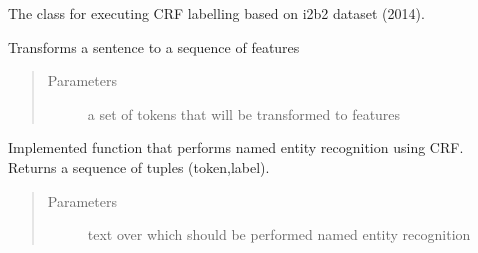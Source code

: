 \documentclass[letterpaper,10pt,english]{sphinxmanual}
\begin{document}
\begin{fulllineitems}
\label{\detokenize{contents:ner_plugins.NER_CRF.NER_CRF}}
The class for executing CRF labelling based on i2b2 dataset (2014).

\begin{fulllineitems}
\label{\detokenize{contents:ner_plugins.NER_CRF.NER_CRF.doc2features}}
Transforms a sentence to a sequence of features
\begin{quote}\begin{description}
\item[{Parameters}] \leavevmode
{} \textendash{} a set of tokens that will be transformed to features

\end{description}\end{quote}

\end{fulllineitems}


\begin{fulllineitems}
\label{\detokenize{contents:ner_plugins.NER_CRF.NER_CRF.perform_NER}}
Implemented function that performs named entity recognition using CRF. Returns a sequence of tuples (token,label).
\begin{quote}\begin{description}
\item[{Parameters}] \leavevmode
{} \textendash{} text over which should be performed named entity recognition

\end{description}\end{quote}

\end{fulllineitems}



\end{fulllineitems}
\end{document}
